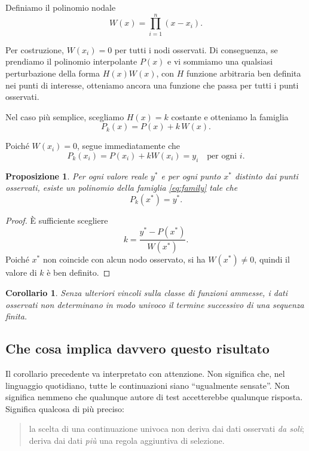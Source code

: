 \documentclass[10pt, a4paper]{article}
\theoremstyle{plain}
\newtheorem{proposition}{Proposizione}
\newtheorem{corollary}{Corollario}
\theoremstyle{definition}
\theoremstyle{remark}
\begin{document}
Definiamo il polinomio nodale
\begin{equation}
W(x)=\prod_{i=1}^{n}(x-x_i).
\label{eq:nodepoly}
\end{equation}

Per costruzione, $W(x_i)=0$ per tutti i nodi osservati. Di conseguenza, se
prendiamo il polinomio interpolante $P(x)$ e vi sommiamo una qualsiasi
perturbazione della forma $H(x)W(x)$, con $H$ funzione arbitraria ben definita
nei punti di interesse, otteniamo ancora una funzione che passa per tutti i
punti osservati.

Nel caso più semplice, scegliamo $H(x)=k$ costante e otteniamo la famiglia
\begin{equation}
P_k(x)=P(x)+k\,W(x).
\label{eq:family}
\end{equation}

Poiché $W(x_i)=0$, segue immediatamente che
\[
P_k(x_i)=P(x_i)+kW(x_i)=y_i
\quad \text{per ogni } i.
\]

\begin{proposition}
Per ogni valore reale $y^\ast$ e per ogni punto $x^\ast$ distinto dai punti
osservati, esiste un polinomio della famiglia \eqref{eq:family} tale che
\[
P_k(x^\ast)=y^\ast.
\]
\label{prop:anyvalue}
\end{proposition}

\begin{proof}
È sufficiente scegliere
\[
k=\frac{y^\ast-P(x^\ast)}{W(x^\ast)}.
\]
Poiché $x^\ast$ non coincide con alcun nodo osservato, si ha $W(x^\ast)\neq 0$,
quindi il valore di $k$ è ben definito.
\end{proof}

\begin{corollary}
Senza ulteriori vincoli sulla classe di funzioni ammesse, i dati osservati non
determinano in modo univoco il termine successivo di una sequenza finita.
\end{corollary}

\subsection{Che cosa implica davvero questo risultato}

Il corollario precedente va interpretato con attenzione. Non significa che, nel
linguaggio quotidiano, tutte le continuazioni siano ``ugualmente sensate''. Non
significa nemmeno che qualunque autore di test accetterebbe qualunque risposta.
Significa qualcosa di più preciso:

\begin{quote}
la scelta di una continuazione univoca non deriva dai dati osservati \emph{da
soli}; deriva dai dati \emph{più} una regola aggiuntiva di selezione.
\end{quote}
\end{document}
